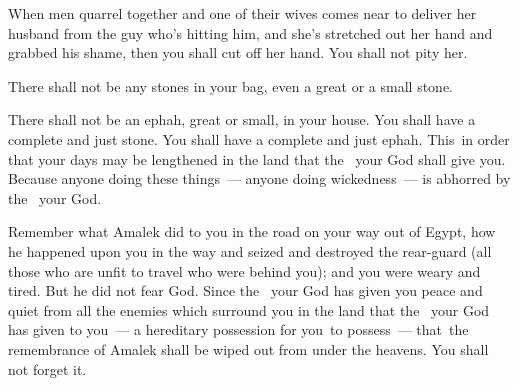 \begin{inparaenum}
   When men quarrel together and one of their wives comes near to deliver her husband from the guy who's hitting him, and she's stretched out her hand and grabbed his shame,%
   then you shall cut off her hand. You shall not pity her.%
  
   There shall not be any stones in your bag, even a great or a small stone.%
  
   There shall not be an ephah, great or small, in your house.%
   You shall have a complete and just stone. You shall have a complete and just ephah. This\understood\ in order that your days may be lengthened in the land that the \lord\ your God shall give you.%
   Because anyone doing these things~--- anyone doing wickedness~--- is abhorred by the \lord\ your God.%
  
   Remember what Amalek did to you in the road on your way out of Egypt,%
   how he happened upon you in the way and seized and destroyed the rear-guard (all those who are unfit to travel who were behind you); and you were weary and tired. But he did not fear God.%
   Since the \lord\ your God has given you peace and quiet from all the enemies which surround you in the land that the \lord\ your God has given to you~--- a hereditary possession for you\understood\ to possess~--- that\understood\ the remembrance of Amalek shall be wiped out from under the heavens. You shall not forget it.%
\end{inparaenum}
